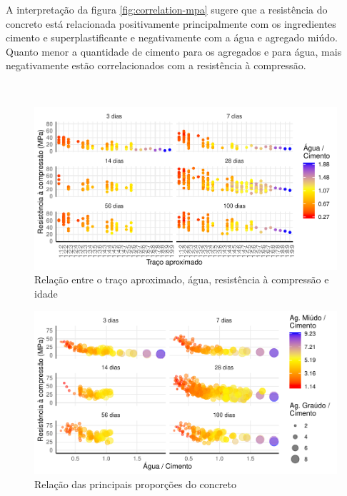 \documentclass[]{article}
\begin{document}
A interpretação da figura \ref{fig:correlation-mpa} sugere que a
resistência do concreto está relacionada positivamente principalmente
com os ingredientes cimento e superplastificante e negativamente com a
água e agregado miúdo. Quanto menor a quantidade de cimento para os
agregados e para água, mais negativamente estão correlacionados com a
resistência à compressão.

~

\begin{figure}

{\centering \includegraphics{paper_PT_files/figure-latex/mix-app-mpa-1} 

}

\caption{Relação entre o traço aproximado, água, resistência à compressão e idade}\label{fig:mix-app-mpa}
\end{figure}
\begin{figure}

{\centering \includegraphics{paper_PT_files/figure-latex/mix-mpa-1} 

}

\caption{Relação das principais proporções do concreto}\label{fig:mix-mpa}
\end{figure}
\end{document}
